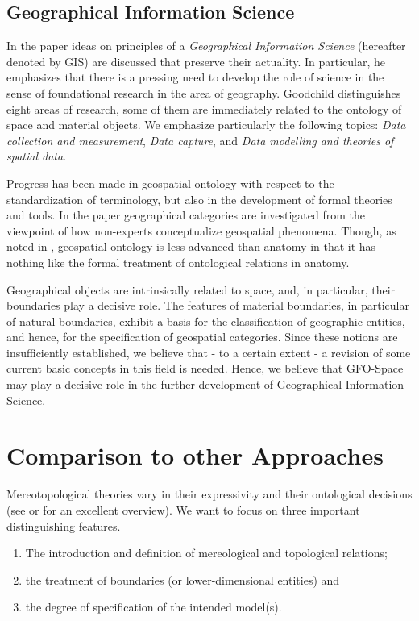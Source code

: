 \documentclass{ao2e}
\begin{document}
{\subsection{Geographical Information Science}
\noindent In the paper \cite{goodchild-m-1992-a} ideas on principles of a {\it Geographical Information Science} (hereafter denoted by GIS) are discussed that preserve their actuality. In particular, he emphasizes that there is a pressing need to develop the role of science in the sense of foundational research in the area of geography. Goodchild distinguishes eight areas of research, some of them are immediately related to the ontology of space and material objects. We emphasize particularly the following topics: {\it Data collection and measurement}, {\it Data capture}, and {\it Data modelling and theories of spatial data}.

Progress has been made in geospatial ontology with respect to the standardization of terminology, but also in the development of formal theories and tools. In the paper \cite{smith-b-2001-a} geographical categories are investigated from the viewpoint of how non-experts conceptualize geospatial phenomena.
Though, as noted in \cite{smith-b-2005-a}, geospatial ontology is less advanced than anatomy in that it has nothing like the formal treatment of ontological relations in anatomy.

Geographical objects are intrinsically related to space, and, in particular, their boundaries play a decisive role.
The features of material boundaries, in particular of natural boundaries, exhibit a basis for the classification of geographic entities, and hence, for the specification of geospatial categories. Since these notions are insufficiently established, we believe that - to a certain extent - a revision of some current basic concepts in this field is needed. Hence, we believe that GFO-Space may play a decisive role in the further development of Geographical Information Science.
 

\section{Comparison to other Approaches}

Mereotopological theories vary in their expressivity and their ontological decisions (see \cite{rohtua} or \cite{ridder-l-2002-a} for an excellent overview). 
We want to focus on three important distinguishing features.

\begin{enumerate}
	\item The introduction and definition of mereological and topological relations;
	\item the treatment of boundaries (or lower-dimensional entities) and
	\item the degree of specification of the intended model(s).
\end{enumerate}

}
\end{document}
